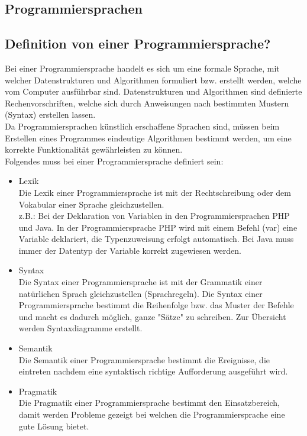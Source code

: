 \documentclass[12pt,a4paper]{report}
\begin{document}
\begin{onehalfspace}
\section{Programmiersprachen}

\subsection{Definition von einer Programmiersprache?}
Bei einer Programmiersprache handelt es sich um eine formale Sprache, mit welcher Datenstrukturen und Algorithmen formuliert bzw. erstellt werden, welche vom Computer ausführbar sind. Datenstrukturen und Algorithmen sind definierte Rechenvorschriften, welche sich durch Anweisungen nach bestimmten Mustern (Syntax) erstellen lassen.\\

Da Programmiersprachen künstlich erschaffene Sprachen sind, müssen beim Erstellen eines Programmes eindeutige Algorithmen bestimmt werden, um eine korrekte Funktionalität gewährleisten zu können.\\
Folgendes muss bei einer Programmiersprache definiert sein:

\begin{itemize}
\item Lexik\\
Die Lexik einer Programmiersprache ist mit der Rechtschreibung oder dem Vokabular einer Sprache gleichzustellen.\\
z.B.: Bei der Deklaration von Variablen in den Programmiersprachen PHP und Java. In der Programmiersprache PHP wird mit einem Befehl (var) eine Variable deklariert, die Typenzuweisung erfolgt automatisch. Bei Java muss immer der Datentyp der Variable korrekt zugewiesen werden.
\item Syntax\\
Die Syntax einer Programmiersprache ist mit der Grammatik einer natürlichen Sprach gleichzustellen (Sprachregeln).
Die Syntax einer Programmiersprache bestimmt die Reihenfolge bzw. das Muster der Befehle und macht es dadurch möglich, ganze "Sätze" zu schreiben. Zur Übersicht werden Syntaxdiagramme erstellt.
\item Semantik\\
Die Semantik einer Programmiersprache bestimmt die Ereignisse, die eintreten nachdem eine syntaktisch richtige Aufforderung ausgeführt wird.
\item Pragmatik\\
Die Pragmatik einer Programmiersprache bestimmt den Einsatzbereich, damit werden Probleme gezeigt bei welchen die Programmiersprache eine gute Lösung bietet.
\end{itemize}



\end{onehalfspace}
\end{document}
